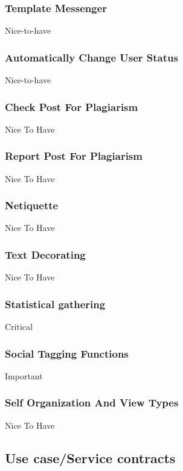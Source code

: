 \documentclass[hidelinks, 12pt, oneside]{article}
\begin{document}
\subsubsection{Template Messenger}
Nice-to-have
\subsubsection{Automatically Change User Status}
Nice-to-have
\subsubsection{Check Post For Plagiarism}
Nice To Have
\subsubsection{Report Post For Plagiarism}
Nice To Have
\subsubsection{Netiquette}
Nice To Have
\subsubsection{Text Decorating}
Nice To Have
\subsubsection{Statistical gathering}
Critical
\subsubsection{Social Tagging Functions}
Important
\subsubsection{Self Organization And View Types}
Nice To Have


\subsection{Use case/Service contracts}
\end{document}
